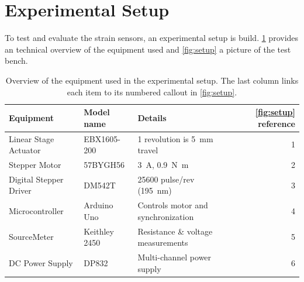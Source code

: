 \section{Experimental Setup}

To test and evaluate the strain sensors, an experimental setup is build. \cref{tab:setup} provides an technical overview of the equipment used and \cref{fig:setup} a picture of the test bench. 

\begin{table}[H]
\centering
\caption{Overview of the equipment used in the experimental setup. The last column links each item to its numbered callout in \cref{fig:setup}.}
\label{tab:setup}
\small
\setlength{\tabcolsep}{6pt}
\begin{tabularx}{\textwidth}{@{}l l X r@{}}
\toprule
Equipment & Model name & Details & \cref{fig:setup} reference\\
\midrule
Linear Stage Actuator & EBX1605-200 & 1 revolution is \SI{5}{\milli\meter} travel & 1 \\
Stepper Motor & 57BYGH56 & \SI{3}{\ampere}, \SI{0.9}{\newton\meter} & 2 \\
Digital Stepper Driver & DM542T & 25600 pulse/rev (\SI{195}{\nano\meter}) & 3 \\
Microcontroller & Arduino Uno & Controls motor and synchronization & 4 \\
SourceMeter & Keithley 2450 & Resistance \& voltage measurements & 5 \\
DC Power Supply & DP832 & Multi-channel power supply & 6 \\
\bottomrule
\end{tabularx}
\end{table}

